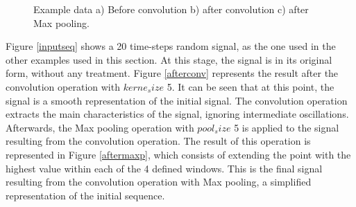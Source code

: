 \begin{figure}[h!]
\captionsetup[subfigure]{position=b}
\centering
{}
\caption{Example data a) Before convolution b) after convolution c) after Max pooling.}
\label{resdata}
\end{figure}


Figure \ref{inputseq} shows a 20 time-steps random signal, as the one used in the other examples used in this section. At this stage, the signal is in its original form, without any treatment. Figure \ref{afterconv} represents the result after the convolution operation with $kerne_size$ 5. It can be seen that at this point, the signal is a smooth representation of the initial signal. The convolution operation extracts the main characteristics of the signal, ignoring intermediate oscillations. Afterwards, the Max pooling operation with $pool_size$ 5 is applied to the signal resulting from the convolution operation. The result of this operation is represented in Figure \ref{aftermaxp}, which consists of extending the point with the highest value within each of the 4 defined windows. This is the final signal resulting from the convolution operation with Max pooling, a simplified representation of the initial sequence.







